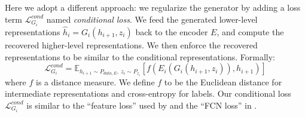 \documentclass[10pt,twocolumn,letterpaper]{article}
\begin{document}
Here we adopt a different approach: we regularize the generator by adding a loss term $\mathcal{L}_{G_{i}}^{cond}$ named \emph{conditional loss}. We feed the generated lower-level representations $\hat{h}_{i}=G_{i}(h_{i+1},z_{i})$ back to the encoder $E$, and compute the recovered higher-level representations. We then enforce the  recovered representations to be similar to the conditional representations. 
Formally:
\begin{equation}\mathcal{L}_{G_{i}}^{cond} = \mathbb{E}_{h_{i+1}\sim P_{data, E},{\ } z_{i}\sim P_{z_{i}}}[f(E_{i}(G_{i}(h_{i+1},z_{i})), h_{i+1})]\end{equation}
where $f$ is a distance measure. We define $f$ to be the Euclidean distance for intermediate representations %
and cross-entropy for labels. %
Our conditional loss $\mathcal{L}_{G_{i}}^{cond}$ is similar to the ``feature loss'' used by \cite{dosovitskiy2016generating} and the ``FCN loss'' in \cite{wang2016generative}. 

\end{document}
